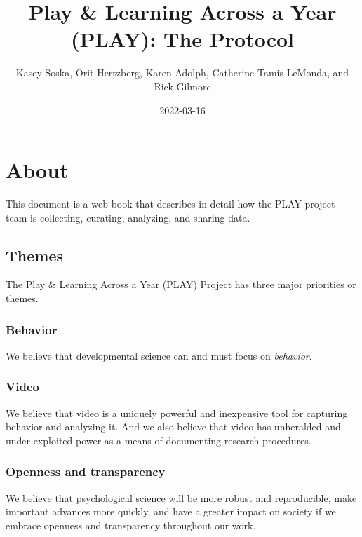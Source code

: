 \documentclass[
]{book}
\title{Play \& Learning Across a Year (PLAY): The Protocol}
\author{Kasey Soska, Orit Hertzberg, Karen Adolph, Catherine Tamis-LeMonda, and Rick Gilmore}
\date{2022-03-16}
\begin{document}
\maketitle

{
\setcounter{tocdepth}{1}
\tableofcontents
}
\hypertarget{about}{%
\chapter{About}\label{about}}

This document is a web-book that describes in detail how the PLAY project team is collecting, curating, analyzing, and sharing data.

\hypertarget{themes}{%
\section{Themes}\label{themes}}

The Play \& Learning Across a Year (PLAY) Project has three major priorities or themes.

\hypertarget{behavior}{%
\subsection*{Behavior}\label{behavior}}

We believe that developmental science can and must focus on \emph{behavior}.

\hypertarget{video}{%
\subsection*{Video}\label{video}}

We believe that video is a uniquely powerful and inexpensive tool for capturing behavior and analyzing it. And we also believe that video has unheralded and under-exploited power as a means of documenting research procedures.

\hypertarget{openness}{%
\subsection*{Openness and transparency}\label{openness}}

We believe that psychological science will be more robust and reproducible, make important advances more quickly, and have a greater impact on society if we embrace openness and transparency throughout our work.
\end{document}
